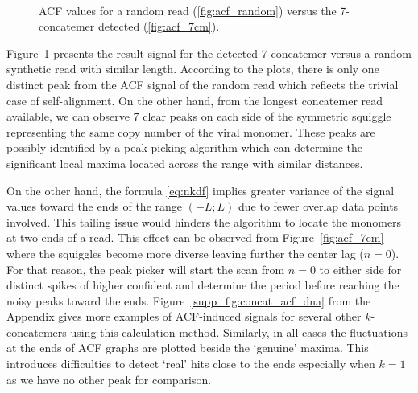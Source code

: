 \begin{figure}[!ht]
\centering
{}
~
\caption{ACF values for a random read (\ref{fig:acf_random}) versus the 7-concatemer detected (\ref{fig:acf_7cm}).}
\label{fig:concat_acf_dna}
\end{figure}

Figure~\ref{fig:concat_acf_dna} presents the result signal for the detected 7-concatemer versus a random synthetic read with similar length.
According to the plots, there is only one distinct peak from the ACF signal of the random read which reflects the trivial case of self-alignment. On the other hand, from the longest concatemer read available, we can observe 7 clear peaks on each side of the symmetric squiggle representing the same copy number of the viral monomer.
These peaks are possibly identified by a peak picking algorithm which can determine the significant local maxima located across the range with similar distances. 

On the other hand, the formula \ref{eq:nkdf} implies greater variance of the signal values toward the ends of the range $(-L;L)$ due to fewer overlap data points involved. This tailing issue would hinders the algorithm to locate the monomers at two ends of a read. This effect can be observed from Figure~\ref{fig:acf_7cm} where the squiggles become more diverse leaving further the center lag ($n=0$).
For that reason, the peak picker will start the scan from $n=0$ to either side for distinct spikes of higher confident and determine the period before reaching the noisy peaks toward the ends.
Figure~\ref{supp_fig:concat_acf_dna} from the Appendix gives more examples of ACF-induced signals for several other $k$-concatemers using this calculation method. Similarly,  in all cases the fluctuations at the ends of ACF graphs are plotted beside the `genuine' maxima. This introduces difficulties to detect `real' hits close to the ends especially when $k=1$ as we have no other peak for comparison.

